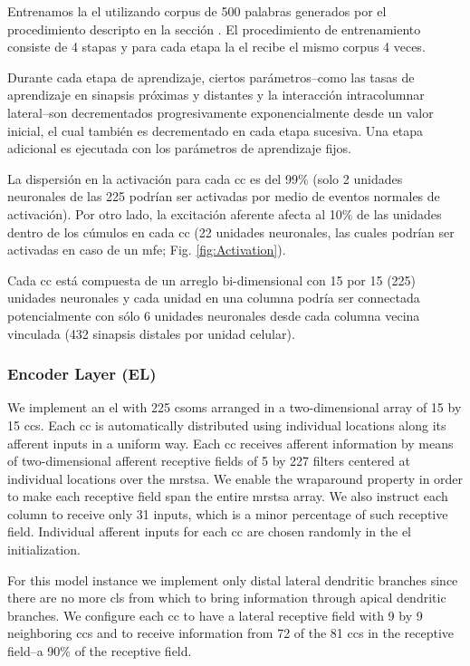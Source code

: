 {Entrenamos la \gls{el} utilizando corpus de 500 palabras generados por el procedimiento descripto en la sección .
El procedimiento de entrenamiento consiste de 4 stapas y para cada etapa la \gls{el} recibe el mismo corpus 4 veces.

Durante cada etapa de aprendizaje, ciertos parámetros--como las tasas de aprendizaje en sinapsis próximas y distantes y la interacción intracolumnar lateral--son decrementados progresivamente exponencialmente desde un valor inicial, el cual también es decrementado en cada etapa sucesiva.
Una etapa adicional es ejecutada con los parámetros de aprendizaje fijos.

La dispersión en la activación para cada \gls{cc} es del 99\% (solo 2 unidades neuronales de las 225 podrían ser activadas por medio de eventos normales de activación).
Por otro lado, la excitación aferente afecta al 10\% de las unidades dentro de los cúmulos en cada \gls{cc}
(22 unidades neuronales, las cuales podrían ser activadas en caso de un \gls{mfe}; Fig. \ref{fig:Activation}).

Cada \gls{cc} está compuesta de un arreglo bi-dimensional con 15 por 15 (225) unidades neuronales y
cada unidad en una columna podría ser connectada potencialmente con sólo 6 unidades neuronales desde cada columna vecina vinculada
(432 sinapsis distales por unidad celular).
}{
\subsubsection{Encoder Layer (EL)}

We implement an \gls{el} with 225 \glspl{csom} arranged in a two-dimensional
array of 15 by 15 \glspl{cc}. Each \gls{cc} is automatically distributed using individual locations along its afferent inputs in a uniform way.
Each \gls{cc} receives afferent information by means of
two-dimensional afferent receptive fields of 5 by 227 filters centered at individual locations over the \gls{mrstsa}.
We enable the wraparound property in order to make each receptive field span the entire
\gls{mrstsa} array.
We also instruct each column to receive only 31 inputs, which is a minor percentage of such
receptive field.
Individual afferent inputs for each \gls{cc} are chosen randomly in the \gls{el} initialization. 

For this model instance we implement only distal lateral dendritic branches since there are
no more \glspl{cl} from which to bring information through apical dendritic branches.
We configure each \gls{cc} to have a lateral receptive field with 9 by 9 neighboring \glspl{cc}
and to receive information from 72 of the 81 \glspl{cc} in the receptive field--a 90\% of the receptive field.

}
